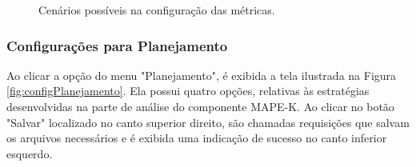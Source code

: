 \documentclass[portugues]{ic-tese}
\begin{document}
\begin{figure}[H]
    \centering
    \caption{Cenários possíveis na configuração das métricas.}
    \label{fig:cenariosMetricas}
\end{figure}

\subsubsection{Configurações para Planejamento}

Ao clicar a opção do menu "Planejamento", é exibida a tela ilustrada na Figura \ref{fig:configPlanejamento}. Ela possui quatro opções, relativas às estratégias desenvolvidas na parte de análise do componente MAPE-K. Ao clicar no botão "Salvar" localizado no canto superior direito, são chamadas requisições que salvam os arquivos necessários e é exibida uma indicação de sucesso no canto inferior esquerdo.
\end{document}
